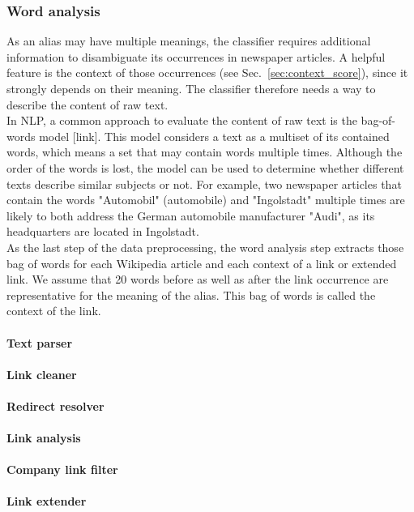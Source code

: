 \subsubsection{Word analysis}
As an alias may have multiple meanings, the classifier requires additional information to disambiguate its occurrences in newspaper articles. A helpful feature is the context of those occurrences (see Sec.~\ref{sec:context_score}), since it strongly depends on their meaning. The classifier therefore needs a way to describe the content of raw text.\\
In NLP, a common approach to evaluate the content of raw text is the bag-of-words model [link]. This model considers a text as a multiset of its contained words, which means a set that may contain words multiple times. Although the order of the words is lost, the model can be used to determine whether different texts describe similar subjects or not. For example, two newspaper articles that contain the words "Automobil" (automobile) and "Ingolstadt" multiple times are likely to both address the German automobile manufacturer "Audi", as its headquarters are located in Ingolstadt.\\
As the last step of the data preprocessing, the word analysis step extracts those bag of words for each Wikipedia article and each context of a link or extended link. We assume that 20 words before as well as after the link occurrence are representative for the meaning of the alias. This bag of words is called the context of the link.\\

\paragraph{Text parser}
\paragraph{Link cleaner}
\paragraph{Redirect resolver}
\paragraph{Link analysis}
\paragraph{Company link filter}
\paragraph{Link extender}
